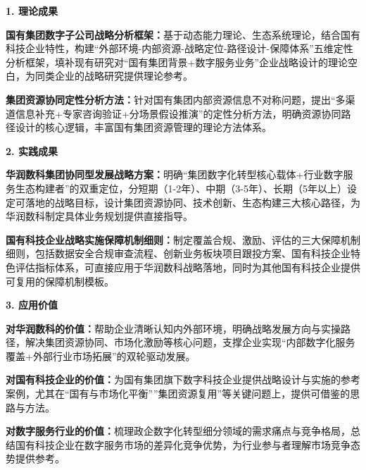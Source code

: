 \documentclass[UTF8, a4paper, 11pt]{ctexart}
\begin{document}
\vspace{0.6cm}

\vspace{0.3cm}

\begin{UnifiedBox}
\setlength{\parindent}{2em}


\vspace{0.2cm}
\noindent \textbf{1. 理论成果}

\noindent \textbf{国有集团数字子公司战略分析框架：}基于动态能力理论、生态系统理论，结合国有科技企业特性，构建``外部环境-内部资源-战略定位-路径设计-保障体系''五维定性分析框架，填补现有研究对``国有集团背景+数字服务业务''企业战略设计的理论空白，为同类企业的战略研究提供理论参考。

\noindent \textbf{集团资源协同定性分析方法：}针对国有集团内部资源信息不对称问题，提出``多渠道信息补充+专家咨询验证+分场景假设推演''的定性分析方法，明确资源协同路径设计的核心逻辑，丰富国有集团资源管理的理论方法体系。

\vspace{0.2cm}
\noindent \textbf{2. 实践成果}

\noindent \textbf{华润数科集团协同型发展战略方案：}明确``集团数字化转型核心载体+行业数字服务生态构建者''的双重定位，分短期（1-2年）、中期（3-5年）、长期（5年以上）设定可落地的战略目标，设计集团资源协同、技术创新、生态构建三大核心路径，为华润数科制定具体业务规划提供直接指导。

\noindent \textbf{国有科技企业战略实施保障机制细则：}制定覆盖合规、激励、评估的三大保障机制细则，包括数据安全合规审查流程、创新业务板块项目跟投方案、国有科技企业特色评估指标体系，可直接应用于华润数科战略落地，同时为其他国有科技企业提供可复用的保障机制模板。

\vspace{0.2cm}
\noindent \textbf{3. 应用价值}

\noindent \textbf{对华润数科的价值：}帮助企业清晰认知内外部环境，明确战略发展方向与实操路径，解决集团资源协同、市场化激励等核心问题，支撑企业实现``内部数字化服务覆盖+外部行业市场拓展''的双轮驱动发展。

\noindent \textbf{对国有科技企业的价值：}为国有集团旗下数字科技企业提供战略设计与实施的参考案例，尤其在``国有与市场化平衡''''集团资源复用''等关键问题上，提供可借鉴的思路与方法。

\noindent \textbf{对数字服务行业的价值：}梳理政企数字化转型细分领域的需求痛点与竞争格局，总结国有科技企业在数字服务市场的差异化竞争优势，为行业参与者理解市场竞争态势提供参考。


\end{UnifiedBox}
\end{document}

